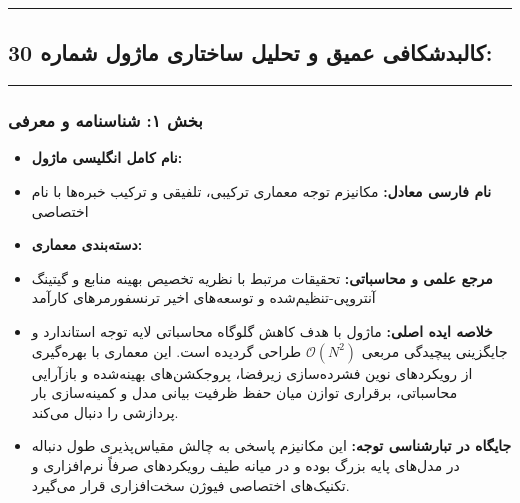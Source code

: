 \clearpage
{}
\vspace*{0.2cm}
\noindent\rule{\textwidth}{1.2pt}\vspace{-0.2cm}
\subsection{کالبدشکافی عمیق و تحلیل ساختاری ماژول شماره 30: }
\label{sec:smart_weighted_ensemble}
\vspace{-0.2cm}\noindent\rule{\textwidth}{0.5pt}
\vspace{0.4cm}
\subsubsection*{بخش ۱: شناسنامه و معرفی }
\begin{itemize}
    \item \textbf{نام کامل انگلیسی ماژول:} 
    \item \textbf{نام فارسی معادل:} مکانیزم توجه معماری ترکیبی، تلفیقی و ترکیب خبره‌ها  با نام اختصاصی 
    \item \textbf{دسته‌بندی معماری:} 
    \item \textbf{مرجع علمی و محاسباتی:} تحقیقات مرتبط با نظریه تخصیص بهینه منابع و گیتینگ آنتروپی-تنظیم‌شده و توسعه‌های اخیر ترنسفورمرهای کارآمد
    \item \textbf{خلاصه ایده اصلی:} ماژول  با هدف کاهش گلوگاه محاسباتی لایه توجه استاندارد و جایگزینی پیچیدگی مربعی $\mathcal{O}(N^2)$ طراحی گردیده است. این معماری با بهره‌گیری از رویکردهای نوین فشرده‌سازی زیرفضا، پروجکشن‌های بهینه‌شده و بازآرایی محاسباتی، برقراری توازن میان حفظ ظرفیت بیانی مدل و کمینه‌سازی بار پردازشی را دنبال می‌کند.
    \item \textbf{جایگاه در تبارشناسی توجه:} این مکانیزم پاسخی به چالش مقیاس‌پذیری طول دنباله در مدل‌های پایه بزرگ بوده و در میانه طیف رویکردهای صرفاً نرم‌افزاری و تکنیک‌های اختصاصی فیوژن سخت‌افزاری قرار می‌گیرد.
\end{itemize}

